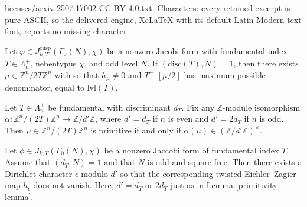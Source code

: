 \documentclass[10pt,a4paper]{amsart}
\newcommand{\Z}{\mathbb{Z}}
\newcommand{\disc}{\text{disc}}
\begin{document}
licenses/arxiv-2507.17002-CC-BY-4.0.txt. Characters: every retained excerpt is pure ASCII, so the delivered engine, XeLaTeX with its default Latin Modern text font, reports no missing character.
\begin{theorem}\label{3.3}
    Let $\varphi \in J^{\text{cusp}}_{k, T}(\Gamma_0(N),\chi)$ be a nonzero Jacobi form with fundamental index $T \in \Lambda_n^+$, nebentypus $\chi$, and odd level $N$. If $(\disc(T),N) = 1$, then there exists $\mu \in \Z^n/2T\Z^n$ with so that $h_\mu \neq 0$ and $T^{-1}[\mu/2]$ has maximum possible denominator, equal to $\mathrm{lvl}(T)$.
\end{theorem} 

\begin{lemma} \label{primitivity lemma}
    Let $T \in \Lambda_n^+$ be fundamental with discriminant $d_T$. Fix any $\Z$-module isomorphism $\alpha:\Z^n/(2T)\Z^n \to \Z/d'\Z$, where $d' = d_T$ if $n$ is even and $d' = 2d_T$ if $n$ is odd. Then $\mu \in \Z^n/(2T)\Z^n$ is primitive if and only if $\alpha(\mu) \in (\Z/d'\Z)^\times$. 
\end{lemma}

\begin{proposition} \label{nonvanishing of twist}
    Let $\phi \in J_{k,T}(\Gamma_0(N),\chi)$ be a nonzero Jaccobi form of fundamental index $T$. Assume that $(d_T,N) = 1$ and that $N$ is odd and square-free. Then there exists a Dirichlet character $\epsilon$ modulo $d'$ so that the corresponding twisted Eichler--Zagier map $h_\epsilon$ does not vanish. Here, $d' = d_T$ or $2d_T$ just as in Lemma \ref{primitivity lemma}.
\end{proposition}
\end{document}
